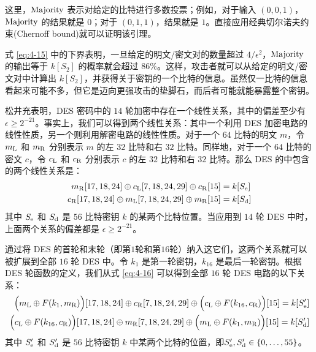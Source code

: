 这里，$\rm Majority$ 表示对给定的比特进行多数投票；例如，对于输入 $(0,0,1)$，$\rm Majority$ 的结果就是 $0$；对于 $(0,1,1)$，结果就是 $1$。直接应用经典切尔诺夫约束(Chernoff bound)就可以证明该引理。

式 \ref{eq:4-15} 中的下界表明，一旦给定的明文/密文对的数量超过 ${4}/{\epsilon^2}$，$\rm Majority$ 的输出等于 $k[S_2]$ 的概率就会超过 $86\%$。这样，攻击者就可以从给定的明文/密文对中计算出 $k[S_2]$，并获得关于密钥的一个比特的信息。虽然仅一比特的信息看起来可能不多，但它是迈向更强攻击的垫脚石，而后者可能就能暴露整个密钥。

\begin{snote}
松井充表明，DES 密码中的 $14$ 轮加密中存在一个线性关系，其中的偏差至少有 $\epsilon\geq2^{-21}$。事实上，我们可以得到两个线性关系：其中一个利用 DES 加密电路的线性性质，另一个则利用解密电路的线性性质。对于一个 $64$ 比特的明文 $m$，令 $m_{\rm L}$ 和 $m_{\rm R}$ 分别表示 $m$ 的左 $32$ 比特和右 $32$ 比特。同样地，对于一个 $64$ 比特的密文 $c$，令 $c_{\rm L}$ 和 $c_{\rm R}$ 分别表示 $c$ 的左 $32$ 比特和右 $32$ 比特。那么 DES 的中包含的两个线性关系是：
\begin{equation}\label{eq:4-16}
	\begin{aligned}
		m_{\rm R}[17,18,24]\oplus c_{\rm L}[7,18,24,29]\oplus c_{\rm R}[15] & = k[S_{\rm e}]\\
		c_{\rm R}[17,18,24]\oplus m_{\rm L}[7,18,24,29]\oplus m_{\rm R}[15] & = k[S_{\rm d}]
	\end{aligned}
\end{equation}
其中 $S_{\rm e}$ 和 $S_{\rm d}$ 是 $56$ 比特密钥 $k$ 的某两个比特位置。当应用到 $14$ 轮 DES 中时，上面两个关系的偏差都是 $\epsilon\geq2^{-21}$。

通过将 DES 的首轮和末轮（即第$1$轮和第$16$轮）纳入这它们，这两个关系就可以被扩展到全部 $16$ 轮 DES 中。令 $k_1$ 是第一轮密钥，$k_{16}$ 是最后一轮密钥。根据 DES 轮函数的定义，我们从式 \ref{eq:4-16} 可以得到全部 $16$ 轮 DES 电路的以下关系：
\begin{align}
	\Big(m_{\rm L}\oplus F(k_1,m_{\rm R})\Big)[17,18,24]\oplus c_{\rm R}[7,18,24,29]\oplus\Big(c_{\rm L}\oplus F(k_{16},c_{\rm R})\Big)[15]=k[S_{\rm e}'] \label{eq:4-17}\\
	\Big(c_{\rm L}\oplus F(k_{16},c_{\rm R})\Big)[17,18,24]\oplus m_{\rm R}[7,18,24,29]\oplus\Big(m_{\rm L}\oplus F(k_1,m_{\rm R})\Big)[15]=k[S_{\rm d}'] \label{eq:4-18}
\end{align}
其中 $S_{\rm e}'$ 和 $S_{\rm d}'$ 是 $56$ 比特密钥 $k$ 中某两个比特的位置，即$S_{\rm e}', S_{\rm d}'\in\{0,\dots,55\}$。


\end{snote}
